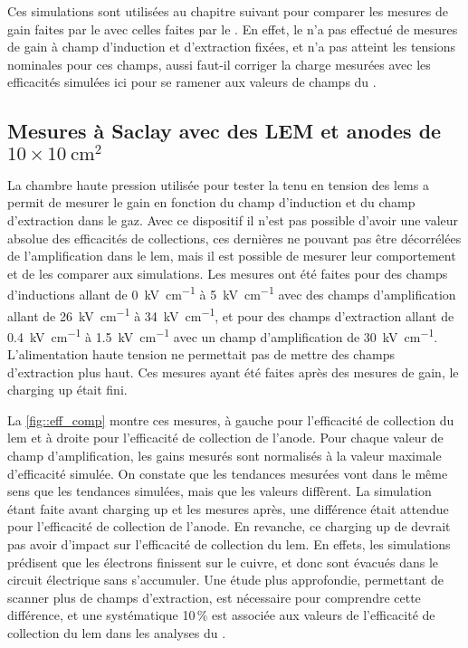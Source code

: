      Ces simulations sont utilisées au chapitre suivant pour comparer les mesures de gain faites par le \TOO{} avec celles faites par le \threeL{}. En effet, le \TOO{} n'a pas effectué de mesures de gain à champ d'induction et d'extraction fixées, et n'a pas atteint les tensions nominales pour ces champs, aussi faut-il corriger la charge mesurées avec les efficacités simulées ici pour se ramener aux valeurs de champs du \threeL{}.

    \subsection{Mesures à Saclay avec des LEM et anodes de \texorpdfstring{$10\times\SI{10}{\cm\squared}$}{10x10cm2} }
      
      La chambre haute pression utilisée pour tester la tenu en tension des \glspl{lem} a permit de mesurer le gain en fonction du champ d'induction et du champ d'extraction dans le gaz. Avec ce dispositif il n'est pas possible d'avoir une valeur absolue des efficacités de collections, ces dernières ne pouvant pas être décorrélées de l'amplification dans le \gls{lem}, mais il est possible de mesurer leur comportement et de les comparer aux simulations. Les mesures ont été faites pour des champs d'inductions allant de \SI{0}{\kilo\volt\per\centi\meter} à \SI{5}{\kilo\volt\per\centi\meter} avec des champs d'amplification allant de \SI{26}{\kilo\volt\per\centi\meter} à \SI{34}{\kilo\volt\per\centi\meter}, et pour des champs d'extraction allant de \SI{0.4}{\kilo\volt\per\centi\meter} à \SI{1.5}{\kilo\volt\per\centi\meter} avec un champ d'amplification de \SI{30}{\kilo\volt\per\centi\meter}. L'alimentation haute tension ne permettait pas de mettre des champs d'extraction plus haut. Ces mesures ayant été faites après des mesures de gain, le charging up était fini. 

      La \autoref{fig::eff_comp} montre ces mesures, à gauche pour l'efficacité de collection du \gls{lem} et à droite pour l'efficacité de collection de l'anode. Pour chaque valeur de champ d'amplification, les gains mesurés sont normalisés à la valeur maximale d'efficacité simulée. On constate que les tendances mesurées vont dans le même sens que les tendances simulées, mais que les valeurs diffèrent. La simulation étant faite avant charging up et les mesures après, une différence était attendue pour l'efficacité de collection de l'anode. En revanche, ce charging up de devrait pas avoir d'impact sur l'efficacité de collection du \gls{lem}. En effets, les simulations prédisent que les électrons finissent sur le cuivre, et donc sont évacués dans le circuit électrique sans s'accumuler. Une étude plus approfondie, permettant de scanner plus de champs d'extraction, est nécessaire pour comprendre cette différence, et une systématique 10\,\% est associée aux valeurs de l'efficacité de collection du \gls{lem} dans les analyses du \TOO{}.

